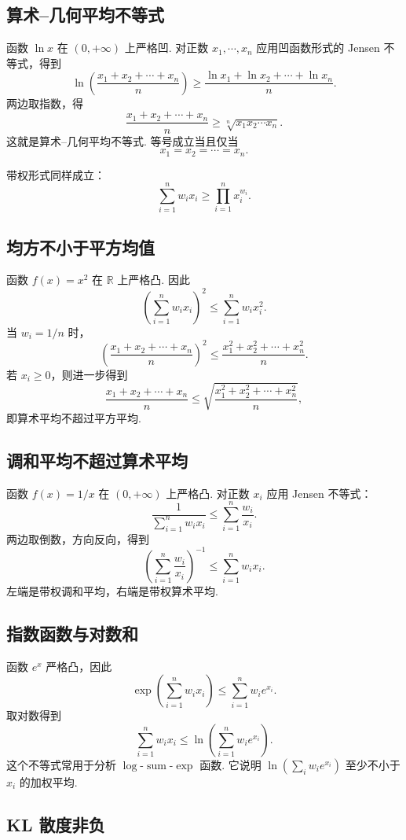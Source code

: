 \documentclass[UTF8, 12pt, fontset=fandol, oneside]{ctexart}
\begin{document}
\subsection*{算术--几何平均不等式}

函数 $\ln x$ 在 $(0,+\infty)$ 上严格凹. 对正数 $x_1,\cdots,x_n$ 应用凹函数形式的 Jensen 不等式，得到
\[
  \ln\left(\frac{x_1+x_2+\cdots+x_n}{n}\right)
  \ge
  \frac{\ln x_1+\ln x_2+\cdots+\ln x_n}{n}.
\]
两边取指数，得
\[
  \frac{x_1+x_2+\cdots+x_n}{n}
  \ge
  \sqrt[n]{x_1x_2\cdots x_n}.
\]
这就是算术--几何平均不等式. 等号成立当且仅当
\[
  x_1=x_2=\cdots=x_n.
\]

带权形式同样成立：
\[
  \sum_{i=1}^n w_ix_i
  \ge
  \prod_{i=1}^n x_i^{w_i}.
\]

\subsection*{均方不小于平方均值}

函数 $f(x)=x^2$ 在 $\mathbb R$ 上严格凸. 因此
\[
  \left(\sum_{i=1}^n w_ix_i\right)^2
  \le
  \sum_{i=1}^n w_ix_i^2.
\]
当 $w_i=1/n$ 时，
\[
  \left(\frac{x_1+x_2+\cdots+x_n}{n}\right)^2
  \le
  \frac{x_1^2+x_2^2+\cdots+x_n^2}{n}.
\]
若 $x_i\ge0$，则进一步得到
\[
  \frac{x_1+x_2+\cdots+x_n}{n}
  \le
  \sqrt{\frac{x_1^2+x_2^2+\cdots+x_n^2}{n}},
\]
即算术平均不超过平方平均.

\subsection*{调和平均不超过算术平均}

函数 $f(x)=1/x$ 在 $(0,+\infty)$ 上严格凸. 对正数 $x_i$ 应用 Jensen 不等式：
\[
  \frac{1}{\sum_{i=1}^n w_ix_i}
  \le
  \sum_{i=1}^n \frac{w_i}{x_i}.
\]
两边取倒数，方向反向，得到
\[
  \left(\sum_{i=1}^n \frac{w_i}{x_i}\right)^{-1}
  \le
  \sum_{i=1}^n w_ix_i.
\]
左端是带权调和平均，右端是带权算术平均.

\subsection*{指数函数与对数和}

函数 $e^x$ 严格凸，因此
\[
  \exp\left(\sum_{i=1}^n w_ix_i\right)
  \le
  \sum_{i=1}^n w_ie^{x_i}.
\]
取对数得到
\[
  \sum_{i=1}^n w_ix_i
  \le
  \ln\left(\sum_{i=1}^n w_ie^{x_i}\right).
\]
这个不等式常用于分析 $\log$-$\operatorname{sum}$-$\exp$ 函数. 它说明 $\ln(\sum_iw_ie^{x_i})$ 至少不小于 $x_i$ 的加权平均.

\subsection*{KL 散度非负}
\end{document}

